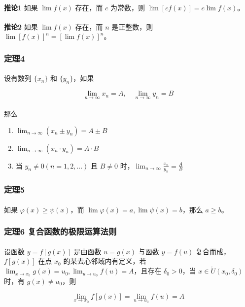 \paragraph{}
\textbf{推论1} 如果 $\lim f(x)$ 存在，而 $c$ 为常数，则 $\lim[cf(x)] = c \lim f(x)$。

\paragraph{}
\textbf{推论2} 如果 $\lim f(x)$ 存在，而 $n$ 是正整数，则 $\lim{[f(x)]}^n={[\lim f(x)]}^n$。

\subsubsection{定理4}
\paragraph{}
设有数列 $\{x_n\}$ 和 $\{y_n\}$，如果

\begin{equation}
\lim_{n \to \infty} x_n = A, \quad \lim_{n \to \infty} y_n = B
\end{equation}

\paragraph{}
那么

\begin{enumerate}
  \item $\displaystyle{\lim_{n \to \infty}(x_n \pm y_n) = A \pm B}$
  \item $\displaystyle{\lim_{n \to \infty}(x_n \cdot y_n) = A \cdot B}$
  \item 当 $y_n \neq 0 (n = 1, 2, ...)$ 且 $B \neq 0$ 时，$\displaystyle{\lim_{n \to \infty} \frac{x_n}{y_n}=\frac{A}{B}}$
\end{enumerate}

\subsubsection{定理5}
\paragraph{}
如果 $\varphi (x) \geq \psi (x)$，而 $\lim \varphi (x) = a, \lim \psi (x) = b$，那么 $a \geq b$。

\subsubsection{定理6 复合函数的极限运算法则}
\paragraph{}
设函数 $y = f[g(x)]$ 是由函数 $u = g(x)$ 与函数 $y = f(u)$ 复合而成，$f[g(x)]$ 在点 $x_0$ 的某去心邻域内有定义，若 $\displaystyle{\lim_{x \to x_0}g(x) = u_0, \lim_{u \to u_0} f(u) = A}$，且存在 $\delta_0 > 0$，当 $x \in \mathring{U}(x_0, \delta_0)$ 时，有 $g(x) \neq u_0$，则

\begin{equation}
\lim_{x \to x_0} f[g(x)] = \lim_{u \to u_0} f(u) = A  
\end{equation}
